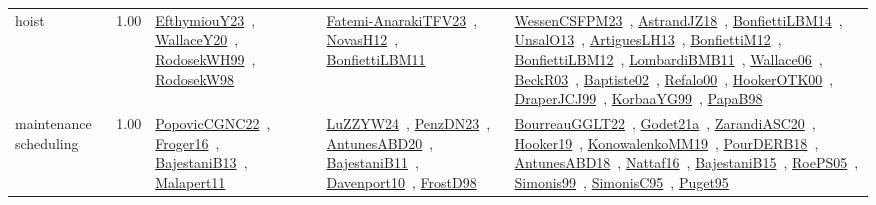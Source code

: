 {\begin{longtable}{p{3cm}r>{\raggedright\arraybackslash}p{6cm}>{\raggedright\arraybackslash}p{6cm}>{\raggedright\arraybackslash}p{8cm}}
\index{hoist}\index{ApplicationAreas!hoist}hoist &  1.00 & \href{../works/EfthymiouY23.pdf}{EfthymiouY23}~\cite{EfthymiouY23}, \href{../works/WallaceY20.pdf}{WallaceY20}~\cite{WallaceY20}, \href{../works/RodosekWH99.pdf}{RodosekWH99}~\cite{RodosekWH99}, \href{../works/RodosekW98.pdf}{RodosekW98}~\cite{RodosekW98} & \href{../works/Fatemi-AnarakiTFV23.pdf}{Fatemi-AnarakiTFV23}~\cite{Fatemi-AnarakiTFV23}, \href{../works/NovasH12.pdf}{NovasH12}~\cite{NovasH12}, \href{../works/BonfiettiLBM11.pdf}{BonfiettiLBM11}~\cite{BonfiettiLBM11} & \href{../works/WessenCSFPM23.pdf}{WessenCSFPM23}~\cite{WessenCSFPM23}, \href{../works/AstrandJZ18.pdf}{AstrandJZ18}~\cite{AstrandJZ18}, \href{../works/BonfiettiLBM14.pdf}{BonfiettiLBM14}~\cite{BonfiettiLBM14}, \href{../works/UnsalO13.pdf}{UnsalO13}~\cite{UnsalO13}, \href{../works/ArtiguesLH13.pdf}{ArtiguesLH13}~\cite{ArtiguesLH13}, \href{../works/BonfiettiM12.pdf}{BonfiettiM12}~\cite{BonfiettiM12}, \href{../works/BonfiettiLBM12.pdf}{BonfiettiLBM12}~\cite{BonfiettiLBM12}, \href{../works/LombardiBMB11.pdf}{LombardiBMB11}~\cite{LombardiBMB11}, \href{../works/Wallace06.pdf}{Wallace06}~\cite{Wallace06}, \href{../works/BeckR03.pdf}{BeckR03}~\cite{BeckR03}, \href{../works/Baptiste02.pdf}{Baptiste02}~\cite{Baptiste02}, \href{../works/Refalo00.pdf}{Refalo00}~\cite{Refalo00}, \href{../works/HookerOTK00.pdf}{HookerOTK00}~\cite{HookerOTK00}, \href{../works/DraperJCJ99.pdf}{DraperJCJ99}~\cite{DraperJCJ99}, \href{../works/KorbaaYG99.pdf}{KorbaaYG99}~\cite{KorbaaYG99}, \href{../works/PapaB98.pdf}{PapaB98}~\cite{PapaB98}\\
\index{maintenance scheduling}\index{ApplicationAreas!maintenance scheduling}maintenance scheduling &  1.00 & \href{../works/PopovicCGNC22.pdf}{PopovicCGNC22}~\cite{PopovicCGNC22}, \href{../works/Froger16.pdf}{Froger16}~\cite{Froger16}, \href{../works/BajestaniB13.pdf}{BajestaniB13}~\cite{BajestaniB13}, \href{../works/Malapert11.pdf}{Malapert11}~\cite{Malapert11} & \href{../works/LuZZYW24.pdf}{LuZZYW24}~\cite{LuZZYW24}, \href{../works/PenzDN23.pdf}{PenzDN23}~\cite{PenzDN23}, \href{../works/AntunesABD20.pdf}{AntunesABD20}~\cite{AntunesABD20}, \href{../works/BajestaniB11.pdf}{BajestaniB11}~\cite{BajestaniB11}, \href{../works/Davenport10.pdf}{Davenport10}~\cite{Davenport10}, \href{../works/FrostD98.pdf}{FrostD98}~\cite{FrostD98} & \href{../works/BourreauGGLT22.pdf}{BourreauGGLT22}~\cite{BourreauGGLT22}, \href{../works/Godet21a.pdf}{Godet21a}~\cite{Godet21a}, \href{../works/ZarandiASC20.pdf}{ZarandiASC20}~\cite{ZarandiASC20}, \href{../works/Hooker19.pdf}{Hooker19}~\cite{Hooker19}, \href{../works/KonowalenkoMM19.pdf}{KonowalenkoMM19}~\cite{KonowalenkoMM19}, \href{../works/PourDERB18.pdf}{PourDERB18}~\cite{PourDERB18}, \href{../works/AntunesABD18.pdf}{AntunesABD18}~\cite{AntunesABD18}, \href{../works/Nattaf16.pdf}{Nattaf16}~\cite{Nattaf16}, \href{../works/BajestaniB15.pdf}{BajestaniB15}~\cite{BajestaniB15}, \href{../works/RoePS05.pdf}{RoePS05}~\cite{RoePS05}, \href{../works/Simonis99.pdf}{Simonis99}~\cite{Simonis99}, \href{../works/SimonisC95.pdf}{SimonisC95}~\cite{SimonisC95}, \href{../works/Puget95.pdf}{Puget95}~\cite{Puget95}\\

\end{longtable}}
